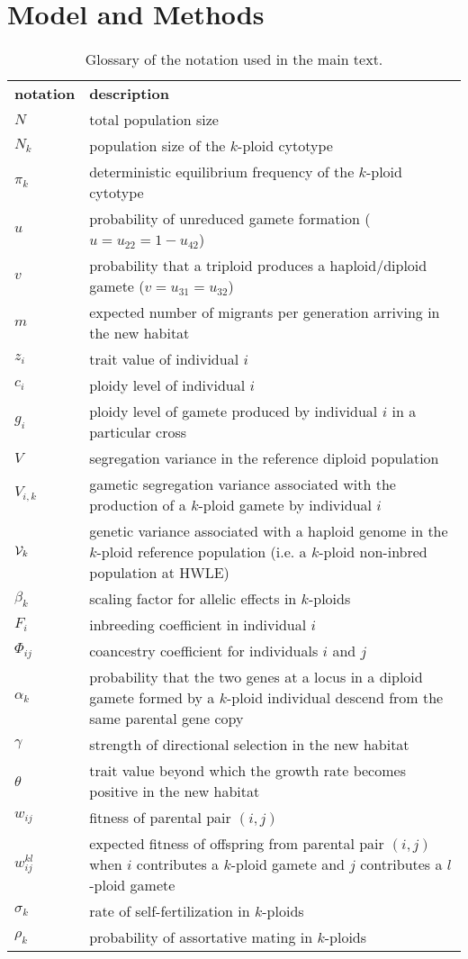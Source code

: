 \documentclass[12pt,a4paper]{article}
\begin{document}
\section*{Model and Methods}

\begin{table}[t]
\caption{Glossary of the notation used in the main text.
} \label{tbl:glossary}
\centering
\small
\begin{tabularx}{\linewidth}{lX}
\cline{1-2}
\textbf{notation}   & \textbf{description}   \\ \cline{1-2}
$N$ & total population size\\
$N_k$ & population size of the $k$-ploid cytotype \\
$\pi_k$ & deterministic equilibrium frequency of the $k$-ploid cytotype \\
$u$ & probability of unreduced gamete formation ($u=u_{22}=1-u_{42}$)\\
$v$ & probability that a triploid produces a haploid/diploid gamete
  ($v=u_{31}=u_{32}$)\\
$m$ & expected number of migrants per generation arriving in the new habitat \\
$z_i$ & trait value of individual $i$ \\
$c_i$ & ploidy level of individual $i$ \\
$g_i$ & ploidy level of gamete produced by individual $i$ in a particular cross\\
$V$ & segregation variance in the reference diploid population \\
$V_{i,k}$ & gametic segregation variance associated with the production of a
  $k$-ploid gamete by individual $i$ \\
$\mathcal{V}_k$ & genetic variance associated with a haploid genome in the $k$-ploid
  reference population (i.e. a $k$-ploid non-inbred population at HWLE) \\
$\beta_{k}$ & scaling factor for allelic effects in $k$-ploids \\
$F_i$ & inbreeding coefficient in individual $i$ \\
$\Phi_{ij}$ & coancestry coefficient for individuals $i$ and $j$ \\
$\alpha_k$ & probability that the two genes at a locus in a diploid gamete
  formed by a $k$-ploid individual descend from the same parental gene copy\\
$\gamma$ & strength of directional selection in the new habitat\\
$\theta$ & trait value beyond which the growth rate becomes positive in the new
habitat \\ $w_{ij}$ & fitness of parental pair $(i,j)$ \\
$w_{ij}^{kl}$ & expected fitness of offspring from parental pair $(i,j)$ when
$i$ contributes a $k$-ploid gamete and $j$ contributes a $l$-ploid gamete \\
$\sigma_k$ & rate of self-fertilization in $k$-ploids \\
$\rho_k$ & probability of assortative mating in $k$-ploids \\
\cline{1-2}
\end{tabularx}%
\end{table}
\end{document}

